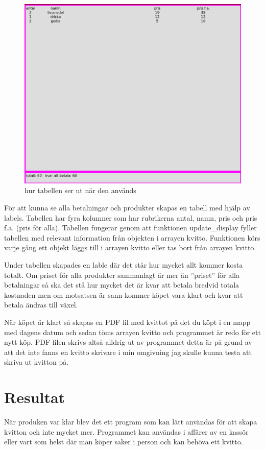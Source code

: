 \documentclass[a4paper, 12pt]{article}
\begin{document}
\begin{figure}[t!]
\centering
  \includegraphics[width=0.7\linewidth]{img/kvitto_disp.png}
  \caption{ hur tabellen ser ut när den används}
  \label{fig:kdisp}
\end{figure}

För att kunna se alla betalningar och produkter skapas en tabell med hjälp av labels. Tabellen har fyra kolumner som har rubrikerna antal, namn, pris och pris f.a. (pris för alla).
Tabellen fungerar genom att funktionen update\_display fyller tabellen med relevant information från objekten i arrayen kvitto. Funktionen körs varje gång ett objekt läggs till i arrayen kvitto eller tas bort från arrayen kvitto.


Under tabellen skapades en lable där det står hur mycket allt kommer kosta totalt. Om priset för alla produkter sammanlagt är mer än ''priset'' för alla betalningar så ska det stå hur mycket det är kvar att betala bredvid totala kostnaden men om motsatsen är sann kommer köpet vara klart och kvar att betala ändras till växel. 


När köpet är klart så skapas en PDF fil med kvittot på det du köpt i en mapp med dagens datum och sedan töms arrayen kvitto och programmet är redo för ett nytt köp.
PDF filen skrivs altså alldrig ut av programmet detta är på grund av att det inte fanns en kvitto skrivare i min omgivning jag skulle kunna testa att skriva ut kvitton på.

\section{Resultat}

När produken var klar blev det ett program som kan lätt användas för att skapa kvitton och inte mycket mer.
Programmet kan användas i affärer av en kassör eller vart som helst där man köper saker i person och kan behöva ett kvitto.
\end{document}
